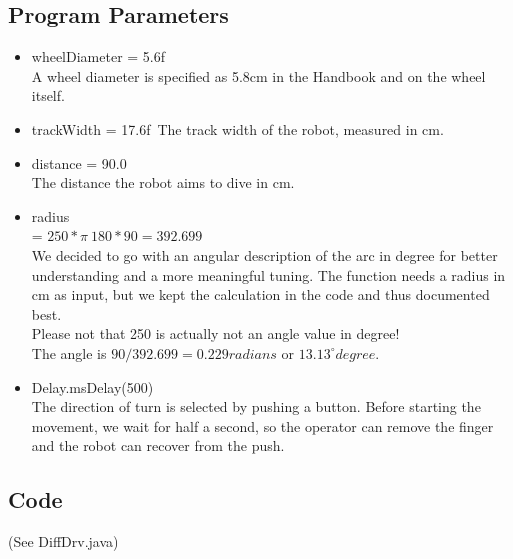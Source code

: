 \documentclass{scrartcl}
\begin{document}
\subsection{Program Parameters}
\begin{itemize}
\item wheelDiameter = 5.6f\\
A wheel diameter is specified as 5.8cm in the Handbook and on the wheel itself.

\item trackWidth = 17.6f\
The track width of the robot, measured in cm.

\item distance = 90.0\\
The distance the robot aims to dive in cm.

\item radius\\
 = $250 * \pi \ 180 * 90 = 392.699$\\
 We decided to go with an angular description of the arc in degree for better understanding and a more meaningful tuning. The function needs a radius in cm as input, but we kept the calculation in the code and thus documented best.\\
 Please not that 250 is actually not an angle value in degree!\\
 The angle is $90/392.699 = 0.229 radians$ or $13.13^{\circ} degree$.
 
\item Delay.msDelay(500)\\
The direction of turn is selected by pushing a button. Before starting the movement, we wait for half a second, so the operator can remove the finger and the robot can recover from the push.
\end{itemize}


\subsection{Code}
(See DiffDrv.java)

\end{document}
